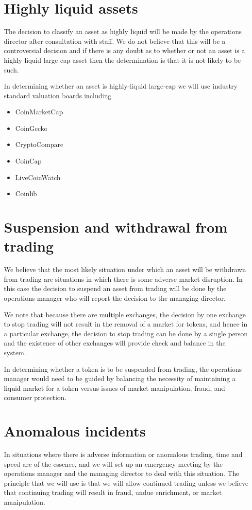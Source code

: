 \section{Highly liquid assets}

The decision to classify an asset as highly liquid will be made by the
operations director after consultation with staff.  We do not believe
that this will be a controversial decision and if there is any doubt
as to whether or not an asset is a highly liquid large cap asset then
the determination is that it is not likely to be such.

In determining whether an asset is highly-liquid large-cap we will
use industry standard valuation boards including
\begin{itemize}
\item CoinMarketCap
\item CoinGecko
\item CryptoCompare
\item CoinCap
\item LiveCoinWatch
\item Coinlib
\end{itemize}

\section{Suspension and withdrawal from trading}
We believe that the most likely situation under which an asset will be
withdrawn from trading are situations in which there is some adverse
market disruption.  In this case the decision to suspend an asset from
trading will be done by the operations manager who will report the
decision to the managing director.

We note that because there are multiple exchanges, the decision by one
exchange to stop trading will not result in the removal of a market
for tokens, and hence in a particular exchange, the decision to stop
trading can be done by a single person and the existence of other
exchanges will provide check and balance in the system.

In determining whether a token is to be suspended from trading, the
operations manager would need to be guided by balancing the necessity
of maintaining a liquid market for a token versus issues of market
manipulation, fraud, and consumer protection.


\section{Anomalous incidents}
In situations where there is adverse information or anomalous trading,
time and speed are of the essence, and we will set up an emergency
meeting by the operations manager and the managing director to deal
with this situation.  The principle that we will use is that we will
allow continued trading unless we believe that continuing trading will
result in fraud, undue enrichment, or market manipulation.

